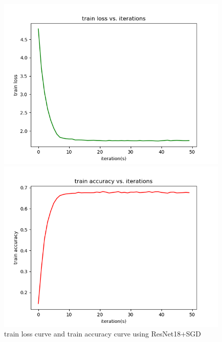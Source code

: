 \documentclass[cn]{elegantbook}
\begin{document}
\begin{figure}[!h]
	\centering
	\begin{minipage}[t]{0.48\textwidth}
		\centering
		\includegraphics[width=\textwidth]{../results/trainloss_res_sgd}
	\end{minipage}
	\begin{minipage}[t]{0.48\textwidth}
		\centering
		\includegraphics[width=\textwidth]{../results/trainacc_res_sgd}
	\end{minipage}
	\caption{\label{trainres_res_sgd}train loss curve and train accuracy curve using ResNet18+SGD}
\end{figure}
\end{document}
